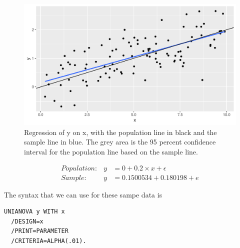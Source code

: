 \documentclass[]{report}\usepackage[]{graphicx}\usepackage[]{color}
\makeatletter
\def\maxwidth{ %
  \ifdim\Gin@nat@width>\linewidth
    \linewidth
  \else
    \Gin@nat@width
  \fi
}
\newenvironment{knitrout}{}{} %
\makeatother
\begin{document}
\begin{knitrout}
\color{fgcolor}\begin{figure}

{\centering \includegraphics[width=\maxwidth]{figure/inf_28-1} 

}

\caption[Regression of y on x, with the population line in black and the sample line in blue]{Regression of y on x, with the population line in black and the sample line in blue. The grey area is the 95 percent confidence interval for the population line based on the sample line.}\label{fig:inf_28}
\end{figure}


\end{knitrout}

\begin{eqnarray}
Population: &y&= 0 + 0.2 \times x + \epsilon\\
Sample: &y&= 0.1500534 + 0.180198 + e
\end{eqnarray}

The syntax that we can use for these sampe data is

\begin{verbatim}
UNIANOVA y WITH x
  /DESIGN=x
  /PRINT=PARAMETER
  /CRITERIA=ALPHA(.01).
\end{verbatim}
\end{document}
